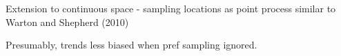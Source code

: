 \documentclass[times,mee,doublespace,]{besauth2}
\begin{document}
Extension to continuous space - sampling locations as point process similar to Warton and Shepherd (2010)

Presumably, trends less biased when pref sampling ignored.






\pagebreak

\end{document}
